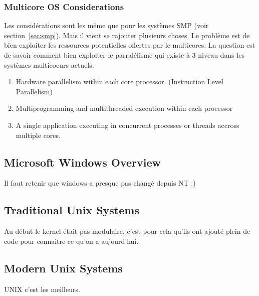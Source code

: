 \subsubsection{Multicore OS Considerations}
Les considérations sont les même que pour les systèmes SMP (voir section~\ref{sec:smp}).
Mais il vient se rajouter plusieurs choses.
Le problème est de bien exploiter les ressources potentielles offertes par le multicores.
La question est de savoir comment bien exploiter le parralélisme qui existe à 3 niveau dans les systèmes multicoeurs actuels:
\begin{enumerate}
  \item
    Hardware parallelism within each core processor.
    (Instruction Level Parallelism)
  \item Multiprogramming and multithreaded execution within each processor
  \item A single application executing in concurrent processes or threads accross multiple cores.
\end{enumerate}

\subsection{Microsoft Windows Overview}
Il faut retenir que windows a presque pas changé depuis NT :)

\subsection{Traditional Unix Systems}
Au début le kernel était pas modulaire, c'est pour cela qu'ils ont ajouté plein de code pour connaitre ce qu'on a aujourd'hui.

\subsection{Modern Unix Systems}
UNIX c'est les meilleurs.

